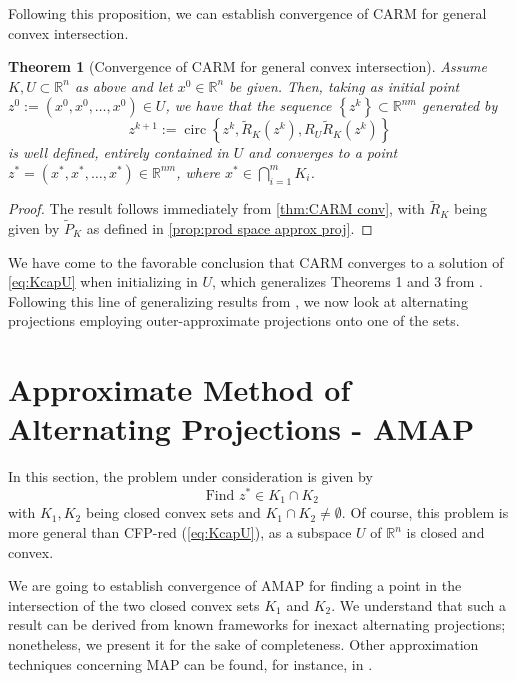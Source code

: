 \documentclass[smallextended,numbook,nospthms]{svjour3}
\theoremstyle{plain}
\newtheorem{theorem}{Theorem}[section]
\theoremstyle{definition}
\def\RR{\mathds R}
\DeclareMathOperator{\circum}{circ}
\begin{document}
Following this proposition, we can establish convergence of CARM for general convex intersection.

\begin{theorem}[Convergence of CARM for general convex intersection]\label{thm:CARM conv general}
Assume $K, U \subset \RR^{n}$ as above and let $x^{0} \in \RR^{n}$ be given. Then, taking as initial point $z^{0}:=\left(x^{0}, x^{0}, \ldots, x^{0}\right) \in U$, we have that the sequence $\left\{z^{k}\right\} \subset \RR^{nm}$ generated by
\[
z^{k+1}:=\circum\left\{z^{k}, \tilde{R}_{K}\left(z^{k}\right), R_{U}\tilde{R}_{K}\left(z^{k}\right)\right\}
\]
is well defined, entirely contained in $U$ and converges to a point $z^{*}=\left(x^{*}, x^{*}, \ldots, x^{*}\right) \in \RR^{nm}$, where $x^{*} \in \bigcap_{i=1}^{m} K_{i}$.
\end{theorem}
\begin{proof}
The result follows immediately from \cref{thm:CARM conv}, with $\tilde{R}_{K}$ being given by $\tilde{P}_{K}$ as defined in \cref{prop:prod space approx proj}.
\end{proof}

We have come to the favorable conclusion that CARM converges to a solution of \cref{eq:KcapU} when initializing in $U$, which generalizes Theorems 1 and 3 from \cite{Behling:2020}. Following this line of generalizing results from \cite{Behling:2020}, we now look at alternating projections employing outer-approximate projections onto one of the sets. 



\newpage
\section{Approximate Method of Alternating Projections - AMAP}\label{sec:AMAP}
In this section, the problem under consideration is given by
$$
\text { Find } z^{*} \in K_1 \cap K_2
$$
with $K_1, K_2$ being closed convex sets and $K_1 \cap K_2 \not = \emptyset$. Of course, this problem is more general than CFP-red (\cref{eq:KcapU}), as a subspace $U$ of $\RR^{n}$ is closed and convex.

We are going to establish convergence of AMAP for finding a point in the intersection of the two closed convex sets $K_1$ and $K_2$. We understand that such a result can be derived from known frameworks for inexact alternating projections; nonetheless, we present it for the sake of completeness. Other approximation techniques concerning MAP can be found, for instance, in \cite{Luke:2012, Luke:2013}.
\end{document}
